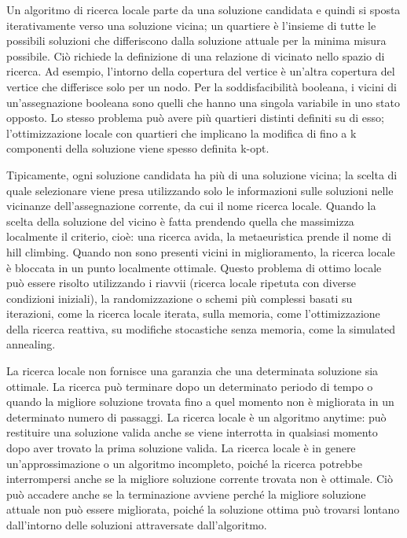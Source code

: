 Un algoritmo di ricerca locale parte da una soluzione candidata e quindi si sposta iterativamente verso una soluzione vicina; un quartiere è l'insieme di tutte le 
possibili soluzioni che differiscono dalla soluzione attuale per la minima misura possibile. Ciò richiede la definizione di una relazione di vicinato nello spazio 
di ricerca. Ad esempio, l'intorno della copertura del vertice è un'altra copertura del vertice che differisce solo per un nodo. Per la soddisfacibilità booleana, 
i vicini di un'assegnazione booleana sono quelli che hanno una singola variabile in uno stato opposto. Lo stesso problema può avere più quartieri distinti definiti 
su di esso; l'ottimizzazione locale con quartieri che implicano la modifica di fino a k componenti della soluzione viene spesso definita k-opt.

Tipicamente, ogni soluzione candidata ha più di una soluzione vicina; la scelta di quale selezionare viene presa utilizzando solo le informazioni sulle soluzioni 
nelle vicinanze dell'assegnazione corrente, da cui il nome ricerca locale. Quando la scelta della soluzione del vicino è fatta prendendo quella che massimizza 
localmente il criterio, cioè: una ricerca avida, la metaeuristica prende il nome di hill climbing. Quando non sono presenti vicini in miglioramento, 
la ricerca locale è bloccata in un punto localmente ottimale. Questo problema di ottimo locale può essere risolto utilizzando i riavvii (ricerca locale ripetuta 
con diverse condizioni iniziali), la randomizzazione o schemi più complessi basati su iterazioni, come la ricerca locale iterata, sulla memoria, come 
l'ottimizzazione della ricerca reattiva, su modifiche stocastiche senza memoria, come la simulated annealing.

La ricerca locale non fornisce una garanzia che una determinata soluzione sia ottimale. La ricerca può terminare dopo un determinato periodo di tempo o quando la 
migliore soluzione trovata fino a quel momento non è migliorata in un determinato numero di passaggi. La ricerca locale è un algoritmo anytime: può restituire 
una soluzione valida anche se viene interrotta in qualsiasi momento dopo aver trovato la prima soluzione valida. La ricerca locale è in genere un'approssimazione 
o un algoritmo incompleto, poiché la ricerca potrebbe interrompersi anche se la migliore soluzione corrente trovata non è ottimale. Ciò può accadere anche se 
la terminazione avviene perché la migliore soluzione attuale non può essere migliorata, poiché la soluzione ottima può trovarsi lontano dall'intorno delle 
soluzioni attraversate dall'algoritmo.

